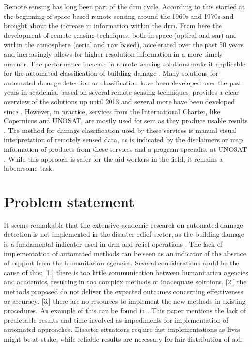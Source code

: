 \noindent Remote sensing has long been part of the \ac{drm} cycle. According to \citet{Kerle2015} this started at the beginning of space-based remote sensing around the 1960s and 1970s and brought about the increase in information within the \ac{drm}. From here the development of remote sensing techniques, both in space (optical and \ac{sar}) and within the atmosphere (aerial and \ac{uav} based),  accelerated over the past 50 years and increasingly allows for higher resolution information in a more timely manner. The performance increase in remote sensing solutions make it applicable for the automated classification of building damage \citep{DellAcqua2012,Dong2013}. Many solutions for automated damage detection or classification have been developed over the past years in academia, based on several remote sensing techniques. \citet{Dong2013} provides a clear overview of the solutions up until 2013 and several more have been developed since \citep{Dominici2017,Sharma2017,Kakooei2017,Vetrivel2016b,Menderes2015}. However, in practice, services from the International Charter, like Copernicus and UNOSAT, are mostly used for \ac{sem} \citep{Voigt2016} as they produce usable results \citep{Kerle2010}. The method for damage classification used by these services is manual visual interpretation of remotely sensed data, as is indicated by the disclaimers or map information of products from these services and a program specialist at UNOSAT \citep{Cop2017,UNDAC2017}. While this approach is safer for the aid workers in the field, it remains a laboursome task. 


\section{Problem statement}
\noindent It seems remarkable that the extensive academic research on automated damage detection is not implemented in the disaster relief sector, as the building damage is a fundamental indicator used in \ac{drm} and relief operations \citep{Schweier2006}. The lack of implementation of automated methods can be seen as an indicator of the absence of support from the humanitarian agencies. Several considerations could be the cause of this; [1.] there is too little communication between humanitarian agencies and academics, resulting in too complex methods or inadequate solutions. [2.] the methods proposed do not deliver the expected outcomes concerning effectiveness or accuracy. [3.] there are no resources to implement the new methods in existing procedures. An example of this can be found in \citet{Ajmar2011}. This paper mentions the lack of predictable results and time involved as impediments for implementation of automated approaches. Disaster situations require fast implementations as lives might be at stake, while reliable results are necessary for fair distribution of aid. \\

